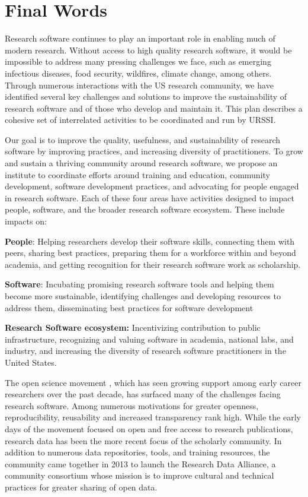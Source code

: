 \documentclass[
]{book}
\begin{document}
\hypertarget{Ch-Summary}{%
\chapter{Final Words}\label{Ch-Summary}}

Research software continues to play an important role in enabling much of modern research. Without access to high quality research software, it would be impossible to address many pressing challenges we face, such as emerging infectious diseases, food security, wildfires, climate change, among others. Through numerous interactions with the US research community, we have identified several key challenges and solutions to improve the sustainability of research software and of those who develop and maintain it. This plan describes a cohesive set of interrelated activities to be coordinated and run by URSSI.

Our goal is to improve the quality, usefulness, and sustainability of research software by improving practices, and increasing diversity of practitioners. To grow and sustain a thriving community around research software, we propose an institute to coordinate efforts around training and education, community development, software development practices, and advocating for people engaged in research software. Each of these four areas have activities designed to impact people, software, and the broader research software ecosystem. These include impacts on:

\textbf{People}: Helping researchers develop their software skills, connecting them with peers, sharing best practices, preparing them for a workforce within and beyond academia, and getting recognition for their research software work as scholarship.

\textbf{Software}: Incubating promising research software tools and helping them become more sustainable, identifying challenges and developing resources to address them, disseminating best practices for software development

\textbf{Research Software ecosystem:} Incentivizing contribution to public infrastructure, recognizing and valuing software in academia, national labs, and industry, and increasing the diversity of research software practitioners in the United States.

The open science movement \citep{tennant_et_al_2020}, which has seen growing support among early career researchers over the past decade, has surfaced many of the challenges facing research software. Among numerous motivations for greater openness, reproducibility, reusability and increased transparency rank high. While the early days of the movement focused on open and free access to research publications, research data has been the more recent focus of the scholarly community. In addition to numerous data repositories, tools, and training resources, the community came together in 2013 to launch the Research Data Alliance, a community consortium whose mission is to improve cultural and technical practices for greater sharing of open data.
\end{document}
